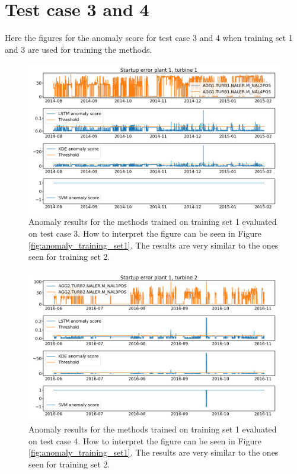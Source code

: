 \chapter{Test case 3 and 4}\label{appendix:startup_failure}
    Here the figures for the anomaly score for test case 3 and 4 when training set 1 and 3 are used for training the methods.
    \begin{figure}
            \centering
            \includegraphics[width=\textwidth]{report/figures/analysis/startup_errors/t1_n2_n4_startup_error_anomaly_score_long.png}
            \caption{Anomaly results for the methods trained on training set 1 evaluated on test case 3. How to interpret the figure can be seen in Figure \ref{fig:anomaly_training_set1}. The results are very similar to the ones seen for training set 2.}
    \end{figure}
    \begin{figure}
        \centering
        \includegraphics[width=\textwidth]{report/figures/analysis/startup_errors/t2_n1_n3_startup_error_anomaly_score_long.png}
        \caption{Anomaly results for the methods trained on training set 1 evaluated on test case 4. How to interpret the figure can be seen in Figure \ref{fig:anomaly_training_set1}. The results are very similar to the ones seen for training set 2.}
    \end{figure}
    
